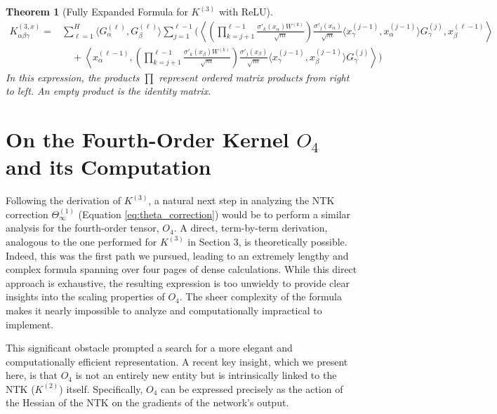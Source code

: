 \documentclass{article}
\newtheorem{theorem}{Theorem}[section]
\begin{document}
\begin{theorem}[Fully Expanded Formula for $K^{(3)}$ with ReLU]
\begin{align}
K^{(3,x)}_{\alpha\beta\gamma} = & \sum_{\ell=1}^{H} \langle G^{(\ell)}_\alpha, G^{(\ell)}_\beta \rangle \sum_{j=1}^{\ell-1} \Biggl( \left\langle \left( \prod_{k=j+1}^{\ell-1} \frac{\sigma'_{k}(x_\alpha) W^{(k)}}{\sqrt{m}} \right) \frac{\sigma'_{j}(x_\alpha)}{\sqrt{m}} \langle x^{(j-1)}_\gamma, x^{(j-1)}_\alpha \rangle G^{(j)}_\gamma, x^{(\ell-1)}_\beta \right\rangle \nonumber \\
& \quad + \left\langle x^{(\ell-1)}_\alpha, \left( \prod_{k=j+1}^{\ell-1} \frac{\sigma'_{k}(x_\beta) W^{(k)}}{\sqrt{m}} \right) \frac{\sigma'_{j}(x_\beta)}{\sqrt{m}} \langle x^{(j-1)}_\gamma, x^{(j-1)}_\beta \rangle G^{(j)}_\gamma \right\rangle \Biggr)
\end{align}
In this expression, the products $\prod$ represent ordered matrix products from right to left. An empty product is the identity matrix.
\end{theorem}

\newpage
\section{On the Fourth-Order Kernel $O_4$ and its Computation}

Following the derivation of $K^{(3)}$, a natural next step in analyzing the NTK correction $\Theta^{(1)}_\infty$ (Equation \ref{eq:theta_correction}) would be to perform a similar analysis for the fourth-order tensor, $O_4$. A direct, term-by-term derivation, analogous to the one performed for $K^{(3)}$ in Section 3, is theoretically possible. Indeed, this was the first path we pursued, leading to an extremely lengthy and complex formula spanning over four pages of dense calculations. While this direct approach is exhaustive, the resulting expression is too unwieldy to provide clear insights into the scaling properties of $O_4$. The sheer complexity of the formula makes it nearly impossible to analyze and computationally impractical to implement.

This significant obstacle prompted a search for a more elegant and computationally efficient representation. A recent key insight, which we present here, is that $O_4$ is not an entirely new entity but is intrinsically linked to the NTK ($K^{(2)}$) itself. Specifically, $O_4$ can be expressed precisely as the action of the Hessian of the NTK on the gradients of the network's output.
\end{document}

